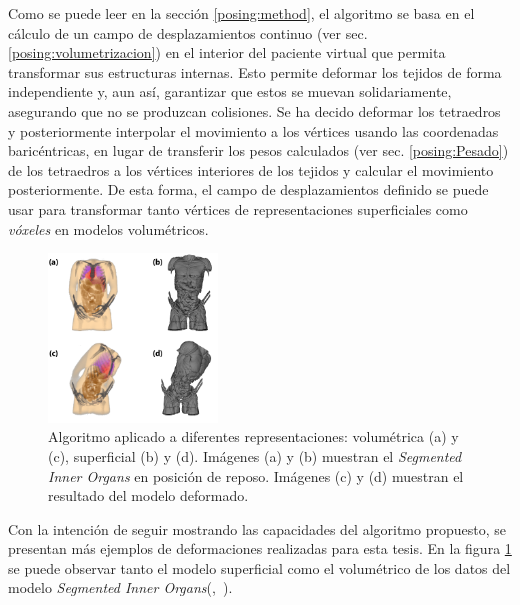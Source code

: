 Como se puede leer en la sección 
\ref{posing:method}, el algoritmo se basa en el cálculo de un campo de desplazamientos continuo (ver sec. \ref{posing:volumetrizacion}) %
en el interior del paciente virtual que permita transformar sus estructuras internas. Esto permite deformar los tejidos de forma independiente y, aun así, garantizar que estos se muevan solidariamente, asegurando que no se produzcan colisiones. Se ha decido deformar los tetraedros y posteriormente interpolar el movimiento a los vértices usando las coordenadas baricéntricas, en lugar de transferir los pesos calculados (ver sec. \ref{posing:Pesado}) de los tetraedros a los vértices interiores de los tejidos y calcular el movimiento posteriormente.
De esta forma, el campo de desplazamientos definido se puede usar para transformar tanto vértices de representaciones superficiales como \emph{vóxeles} en modelos volumétricos. 


%


\begin{figure}[!ht]%
   \centering
   \includegraphics[width=0.4\textwidth]{IMG/HV}
    \caption{Algoritmo aplicado a diferentes representaciones: volumétrica (a) y (c), superficial (b) y (d). Imágenes (a) y (b) muestran el \emph{Segmented Inner Organs} en posición de reposo. Imágenes (c) y (d) muestran el resultado del modelo deformado.}
    \label{fig:humanvisible}
\end{figure}
Con la intención de seguir mostrando las capacidades del algoritmo propuesto, se presentan más ejemplos de deformaciones realizadas para esta tesis. En la figura \ref{fig:humanvisible} se puede observar tanto el modelo superficial como el volumétrico de los datos del modelo \emph{Segmented Inner Organs}(\cite{VM2002},~\cite{VoxelMan}).



